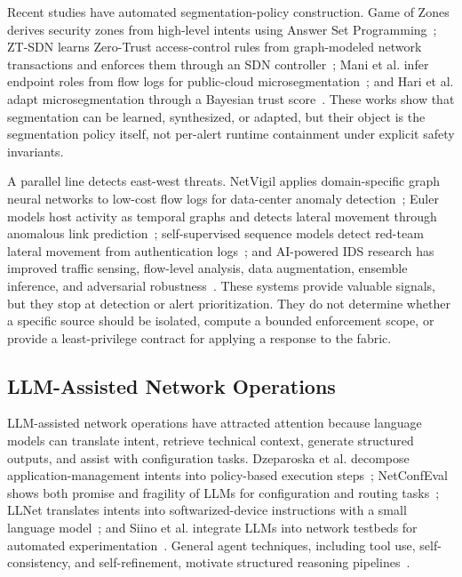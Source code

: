 \documentclass[final,5p]{elsarticle}
\begin{document}
Recent studies have automated segmentation-policy construction. Game of Zones derives security zones from high-level intents using Answer Set Programming~\cite{canavese2025gameofzones}; ZT-SDN learns Zero-Trust access-control rules from graph-modeled network transactions and enforces them through an SDN controller~\cite{katsis2025ztsdn}; Mani et al. infer endpoint roles from flow logs for public-cloud microsegmentation~\cite{mani2025rolebased}; and Hari et al. adapt microsegmentation through a Bayesian trust score~\cite{hari2026threetier}. These works show that segmentation can be learned, synthesized, or adapted, but their object is the segmentation policy itself, not per-alert runtime containment under explicit safety invariants.

A parallel line detects east-west threats. NetVigil applies domain-specific graph neural networks to low-cost flow logs for data-center anomaly detection~\cite{netvigil}; Euler models host activity as temporal graphs and detects lateral movement through anomalous link prediction~\cite{king2022euler}; self-supervised sequence models detect red-team lateral movement from authentication logs~\cite{gokstorp2024anomaly}; and AI-powered IDS research has improved traffic sensing, flow-level analysis, data augmentation, ensemble inference, and adversarial robustness~\cite{cSDAID22,jSAID23,jAPELID24}. These systems provide valuable signals, but they stop at detection or alert prioritization. They do not determine whether a specific source should be isolated, compute a bounded enforcement scope, or provide a least-privilege contract for applying a response to the fabric.

\subsection{LLM-Assisted Network Operations}
\label{sec:rw_llm_agent}

LLM-assisted network operations have attracted attention because language models can translate intent, retrieve technical context, generate structured outputs, and assist with configuration tasks. Dzeparoska et al. decompose application-management intents into policy-based execution steps~\cite{dzeparoska2023llmpolicy}; NetConfEval shows both promise and fragility of LLMs for configuration and routing tasks~\cite{wang2024netconfeval}; LLNet translates intents into softwarized-device instructions with a small language model~\cite{angi2025llnet}; and Siino et al. integrate LLMs into network testbeds for automated experimentation~\cite{siino2025llmtestbed}. General agent techniques, including tool use, self-consistency, and self-refinement, motivate structured reasoning pipelines~\cite{schick2023toolformer,wang2023selfconsistency,madaan2023selfrefine,liu2023trustworthyllm}.
\end{document}
